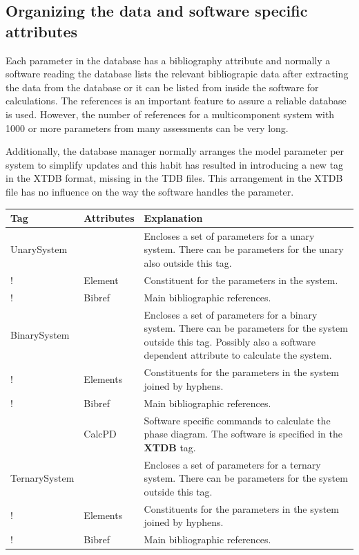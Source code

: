 \documentclass{article}
\begin{document}
\subsection{Organizing the data and software specific attributes}\label{sec:subsys}\label{sec:soft}\label{sec:last}

Each parameter in the database has a bibliography attribute and
normally a software reading the database lists the relevant
bibliograpic data after extracting the data from the database or it
can be listed from inside the software for calculations.  The
references is an important feature to assure a reliable database is
used.  However, the number of references for a multicomponent system
with 1000 or more parameters from many assessments can be very long.

Additionally, the database manager normally arranges the model
parameter per system to simplify updates and this habit has resulted
in introducing a new tag in the XTDB format, missing in the TDB files.
This arrangement in the XTDB file has no influence on the way the
software handles the parameter.

\bigskip
\begin{tabular}{|p{} p{} p{}|}\hline
  Tag & Attributes &  Explanation\\\hline

  UnarySystem  && Encloses a set of parameters for a unary system.
          There can be parameters for the unary also outside this tag.\\
!          & Element & Constituent for the parameters in the system.\\
!          & Bibref & Main bibliographic references.\\\hline

  BinarySystem  && Encloses a set of parameters for a binary system.
          There can be parameters for the system outside this tag.  Possibly
          also a software dependent attribute to calculate the system.\\
!          & Elements & Constituents for the parameters in the system joined
                       by hyphens.\\
!          & Bibref & Main bibliographic references.\\
          & CalcPD & Software specific commands to calculate the
                       phase diagram.  The software is specified in the
                       {\bf XTDB} tag.\\\hline

  TernarySystem  && Encloses a set of parameters for a ternary system.
          There can be parameters for the system outside this tag.\\
!          & Elements & Constituents for the parameters in the system joined
                       by hyphens.\\
!          & Bibref & Main bibliographic references.\\\hline
\end{tabular}
\end{document}
